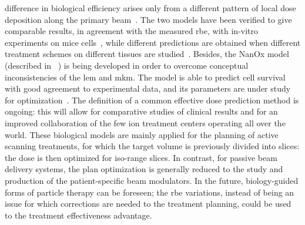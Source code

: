 difference in biological efficiency arises only from a different pattern of local dose deposition along the primary beam~\parencite{Kramer2000, Jakel2001a}.
The two models have been verified to give comparable results, in agreement with the measured \gls{rbe}, with in-vitro experiments on mice cells~\parencite{Uzawa2009}, while different predictions are obtained when different treatment schemes on different tissues are studied~\parencite{Fossati2012, Steinstrater2012}. Besides, the NanOx model (described in ~\cite{Cunha2017}) is being developed in order to overcome conceptual inconsistencies of the \gls{lem} and \gls{mkm}. The model is able to predict cell survival with good agreement to experimental data, and its parameters are under study for optimization~\parencite{Monini2018}. The definition of a common effective dose prediction method is ongoing: this will allow for comparative studies of clinical results and for an improved collaboration of the few ion treatment centers operating all over the world.
These biological models are mainly applied for the planning of active scanning treatments, for which the target volume is previously divided into slices: the dose is then optimized for iso-range slices. In contrast, for passive beam delivery systems, the plan optimization is generally reduced to the study and production of the patient-specific beam modulators. 
In the future, biology-guided forms of particle therapy can be foreseen; the \gls{rbe} variations, instead of being an issue for which corrections are needed to the treatment planning, could be used to the treatment effectiveness advantage.  

